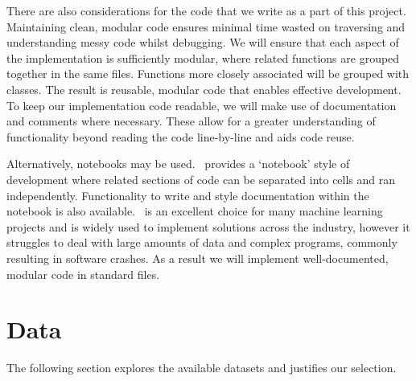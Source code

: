 There are also considerations for the code that we write as a part of this project. Maintaining clean, modular code ensures minimal time wasted on traversing and understanding messy code whilst debugging. We will ensure that each aspect of the implementation is sufficiently modular, where related functions are grouped together in the same  files. Functions more closely associated will be grouped with  classes. The result is reusable, modular code that enables effective development. To keep our implementation code readable, we will make use of documentation and comments where necessary. These allow for a greater understanding of functionality beyond reading the code line-by-line and aids code reuse. 

Alternatively,  notebooks may be used.\  provides a `notebook' style of development where related sections of code can be separated into cells and ran independently. Functionality to write and style documentation within the notebook is also available.\  is an excellent choice for many machine learning projects and is widely used to implement solutions across the industry, however it struggles to deal with large amounts of data and complex programs, commonly resulting in software crashes. As a result we will implement well-documented, modular code in standard  files.

\section{Data}
The following section explores the available datasets and justifies our selection.

